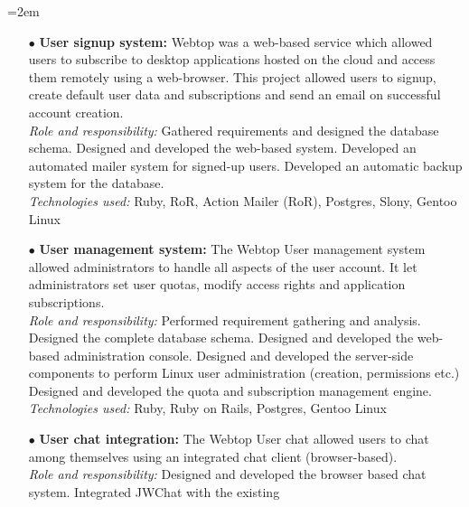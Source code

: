 \documentclass{scrartcl}
\newcommand{\MarginDate}[1]{\marginpar{\raggedleft\itshape\small#1}}
\newcommand{\Description}[1]{\hangindent=2em\hangafter=0\noindent\raggedright\footnotesize{#1}\par\normalsize}
\begin{document}
\begin{cv}{
\href{http://www.develmj.com}{}
}
\Description{
\begin{itemize}
\item[\footnotesize$\bullet$] \textbf{User signup system: }{\scriptsize Webtop was a web-based service which \MarginDate{Atlantis Webtop}allowed users to
    subscribe to desktop applications hosted on the cloud and access
    them remotely using a web-browser. This project allowed users to signup,
    create default user data and subscriptions and send an email on
    successful account creation.}\\
  \vspace{0.5em}
    \textsl{Role and responsibility:} {\scriptsize Gathered requirements and
      designed the database schema. Designed and developed the
      web-based system. Developed an automated mailer system for
      signed-up users. Developed an automatic backup system for the
      database.}\\
\vspace{0.5em}
\textsl{Technologies used:} {\scriptsize Ruby, RoR, Action Mailer (RoR), Postgres, Slony,
Gentoo Linux}
  \item[\footnotesize$\bullet$] \textbf{User management system:
  }{\scriptsize The Webtop User management system allowed
administrators to handle all aspects of the user account. It let administrators
set user quotas, modify access rights and application
subscriptions.}\\
    \vspace{0.5em}
    \textsl{Role and responsibility:} {\scriptsize Performed requirement gathering
      and analysis. Designed the complete database schema. Designed and
      developed the web-based administration console. Designed and
      developed the server-side components to perform Linux user
      administration (creation, permissions etc.) Designed and developed
      the quota and subscription management engine.}\\
    \vspace{0.5em}
    \textsl{Technologies used:} {\scriptsize Ruby, Ruby on Rails, Postgres, Gentoo Linux}
  \item[\footnotesize$\bullet$] \textbf{User chat integration:
  }{\scriptsize The Webtop User chat allowed users to chat among
    themselves using an integrated chat client (browser-based).}\\
    \vspace{0.5em}
    \textsl{Role and responsibility:} {\scriptsize Designed and developed the
      browser based chat system. Integrated JWChat with the existing
}
\end{itemize}}
\end{cv}
\end{document}

